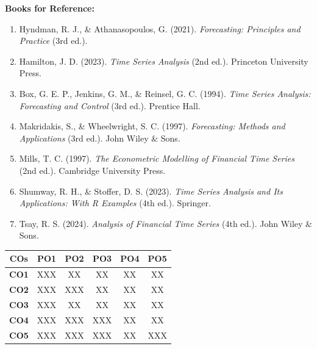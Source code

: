 \vspace{0.5em}
\noindent\textbf{Books for Reference:}
\begin{enumerate}[leftmargin=1.5em, label=\arabic*., itemsep=1pt, topsep=1pt, parsep=0pt]
    \small
    \item Hyndman, R. J., \& Athanasopoulos, G. (2021). \textit{Forecasting: Principles and Practice} (3rd ed.).
    \item Hamilton, J. D. (2023). \textit{Time Series Analysis} (2nd ed.). Princeton University Press.
    \item Box, G. E. P., Jenkins, G. M., \& Reinsel, G. C. (1994). \textit{Time Series Analysis: Forecasting and Control} (3rd ed.). Prentice Hall.
    \item Makridakis, S., \& Wheelwright, S. C. (1997). \textit{Forecasting: Methods and Applications} (3rd ed.). John Wiley \& Sons.
    \item Mills, T. C. (1997). \textit{The Econometric Modelling of Financial Time Series} (2nd ed.). Cambridge University Press.
    \item Shumway, R. H., \& Stoffer, D. S. (2023). \textit{Time Series Analysis and Its Applications: With R Examples} (4th ed.). Springer.
    \item Tsay, R. S. (2024). \textit{Analysis of Financial Time Series} (4th ed.). John Wiley \& Sons.
\end{enumerate}

\vspace{0.4em}
\begin{center}
\footnotesize
\begin{tabular}{|c|c|c|c|c|c|}
\hline
\textbf{COs} & \textbf{PO1} & \textbf{PO2} & \textbf{PO3} & \textbf{PO4} & \textbf{PO5} \\
\hline
\textbf{CO1} & XXX & XX & XX & XX & XX \\
\hline
\textbf{CO2} & XXX & XXX & XX & XX & XX \\
\hline
\textbf{CO3} & XXX & XX & XX & XX & XX \\
\hline
\textbf{CO4} & XXX & XXX & XXX & XX & XX \\
\hline
\textbf{CO5} & XXX & XXX & XXX & XX & XXX \\
\hline
\end{tabular}
\end{center}
\normalsize

\newpage
